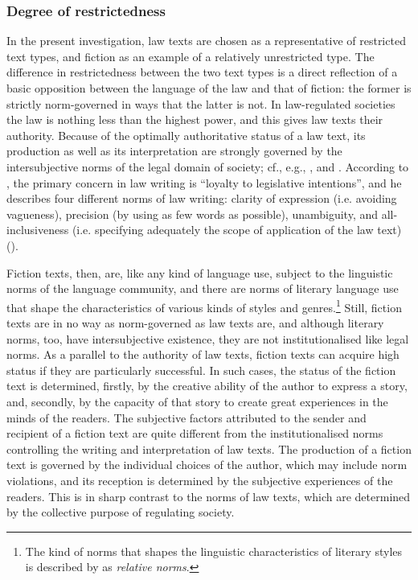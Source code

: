 \documentclass[output=paper]{LSP/langsci}
\begin{document}
\subsubsection{Degree of restrictedness}\label{sec:thunes:4.2.1}

In the present investigation, law texts are chosen as a representative of restricted text types, and fiction as an example of a relatively unrestricted type. The difference in restrictedness between the two text types is a direct reflection of a basic opposition between the language of the law and that of fiction: the former is strictly norm-governed in ways that the latter is not. In law-regulated societies the law is nothing less than the highest power, and this gives law texts their authority. Because of the optimally authoritative status of a law text, its production as well as its interpretation are strongly governed by the intersubjective norms of the legal domain of society; cf., e.g., \citet[53-54]{Bowers1989}, and \citet[13-14]{Cao2007}. According to \citet[46-47]{Bhatia2010}, the primary concern in law writing is ``loyalty to legislative intentions'', and he describes four different norms of law writing: clarity of expression (i.e. avoiding vagueness), precision (by using as few words as possible), unambiguity, and all-inclusiveness (i.e. specifying adequately the scope of application of the law text) (\citeyear[38-39]{Bhatia2010}).

Fiction texts, then, are, like any kind of language use, subject to the linguistic norms of the language community, and there are norms of literary language use that shape the characteristics of various kinds of styles and genres.\footnote{The kind of norms that shapes the linguistic characteristics of literary styles is described by \citet[41-44]{Leech2007} as \textit{relative norms}.} Still, fiction texts are in no way as norm-governed as law texts are, and although literary norms, too, have intersubjective existence, they are not institutionalised like legal norms. As a parallel to the authority of law texts, fiction texts can acquire high status if they are particularly successful. In such cases, the status of the fiction text is determined, firstly, by the creative ability of the author to express a story, and, secondly, by the capacity of that story to create great experiences in the minds of the readers. The subjective factors attributed to the sender and recipient of a fiction text are quite different from the institutionalised norms controlling the writing and interpretation of law texts. The production of a fiction text is governed by the individual choices of the author, which may include norm violations, and its reception is determined by the subjective experiences of the readers. This is in sharp contrast to the norms of law texts, which are determined by the collective purpose of regulating society.
\end{document}

